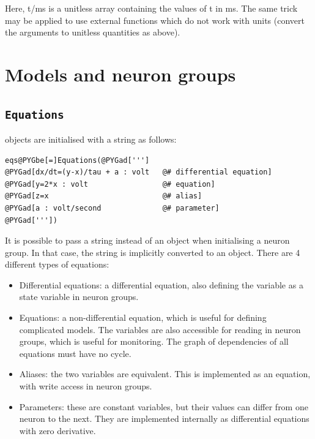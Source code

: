 \documentclass[letterpaper,10pt,english]{manual}
\begin{document}
Here, t/ms is a unitless array containing the values of t in ms.
The same trick may be applied to use external functions which do not work with units
(convert the arguments to unitless quantities as above).

\resetcurrentobjects


\section{Models and neuron groups}


\subsection{\texttt{Equations}}

\hyperlink{brian.Equations}{} objects are initialised with a string as follows:

\begin{Verbatim}[commandchars=@\[\]]
eqs@PYGbe[=]Equations(@PYGad[''']
@PYGad[dx/dt=(y-x)/tau + a : volt   @# differential equation]
@PYGad[y=2*x : volt                 @# equation]
@PYGad[z=x                          @# alias]
@PYGad[a : volt/second              @# parameter]
@PYGad['''])
\end{Verbatim}
It is possible to pass a string instead of an \hyperlink{brian.Equations}{} object when initialising
a neuron group. In that case, the string is implicitly converted to an \hyperlink{brian.Equations}{} object.
There are 4 different types of equations:
\begin{itemize}
\item {} 
Differential equations: a differential equation, also defining the variable as a state
variable in neuron groups.

\item {} 
Equations: a non-differential equation, which is useful for defining complicated models.
The variables are also accessible for reading in neuron groups, which is useful for
monitoring. The graph of dependencies of all equations must have no cycle.

\item {} 
Aliases: the two variables are equivalent. This is implemented as an equation,
with write access in neuron groups.

\item {} 
Parameters: these are constant variables, but their values can differ from one neuron
to the next. They are implemented internally as differential equations with zero
derivative.

\end{itemize}
\end{document}
